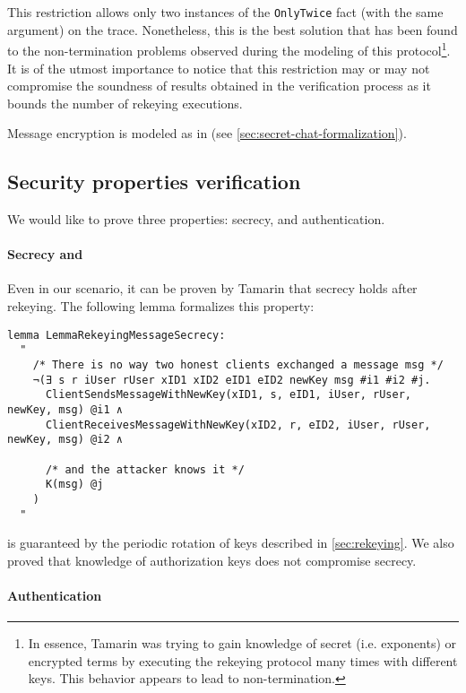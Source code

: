 This restriction allows only two instances of the \lstinline{OnlyTwice} fact (with the same argument) on the trace.
Nonetheless, this is the best solution that has been found to the non-termination problems observed during the modeling of this protocol\footnote{In essence, Tamarin was trying to gain knowledge of secret (i.e. exponents) or encrypted terms by executing the rekeying protocol many times with different \schat{} keys. This behavior appears to lead to non-termination.}. It is of the utmost importance to notice that this restriction may or may not compromise the soundness of results obtained in the verification process as it bounds the number of rekeying executions.

Message encryption is modeled as in \schats{} (see \cref{sec:secret-chat-formalization}).

\subsection{Security properties verification}
We would like to prove three properties: secrecy, \pfs{} and authentication.

\paragraph{Secrecy and \pfs{}}

Even in our scenario, it can be proven by Tamarin that secrecy holds after rekeying. The following lemma formalizes this property:

\begin{lstlisting}
lemma LemmaRekeyingMessageSecrecy:
  "
    /* There is no way two honest clients exchanged a message msg */
    ¬(∃ s r iUser rUser xID1 xID2 eID1 eID2 newKey msg #i1 #i2 #j.
      ClientSendsMessageWithNewKey(xID1, s, eID1, iUser, rUser, newKey, msg) @i1 ∧
      ClientReceivesMessageWithNewKey(xID2, r, eID2, iUser, rUser, newKey, msg) @i2 ∧

      /* and the attacker knows it */
      K(msg) @j
    )
  "
\end{lstlisting}

\Pfs{} is guaranteed by the periodic rotation of keys described in \cref{sec:rekeying}. We also proved that knowledge of authorization keys does not compromise secrecy.

\paragraph{Authentication}

